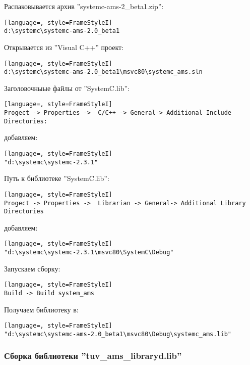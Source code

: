 Распаковывается архив ''systemc-ams-2\_beta1.zip'':
\begin{lstlisting}[language=, style=FrameStyleI]
d:\systemc\systemc-ams-2.0_beta1
\end{lstlisting}




Открывается из ''Visual C++'' проект:
\begin{lstlisting}[language=, style=FrameStyleI]
d:\systemc\systemc-ams-2.0_beta1\msvc80\systemc_ams.sln
\end{lstlisting}

Заголовочныые файлы от ''SystemC.lib'':

\begin{lstlisting}[language=, style=FrameStyleI]
Progect -> Properties ->  C/C++ -> General-> Additional Include Directories:
\end{lstlisting}

добавляем:

\begin{lstlisting}[language=, style=FrameStyleI]
"d:\systemc\systemc-2.3.1"
\end{lstlisting}

Путь к библиотеке ''SystemC.lib'':

\begin{lstlisting}[language=, style=FrameStyleI]
Progect -> Properties ->  Librarian -> General-> Additional Library Directories
\end{lstlisting}

добавляем:

\begin{lstlisting}[language=, style=FrameStyleI]
"d:\systemc\systemc-2.3.1\msvc80\SystemC\Debug"
\end{lstlisting}




Запускаем сборку:

\begin{lstlisting}[language=, style=FrameStyleI]
Build -> Build system_ams
\end{lstlisting}


Получаем библиотеку в:

\begin{lstlisting}[language=, style=FrameStyleI]
"d:\systemc\systemc-ams-2.0_beta1\msvc80\Debug\systemc_ams.lib"
\end{lstlisting}



\subsubsection{Сборка библиотеки ''tuv\_ams\_libraryd.lib''}

